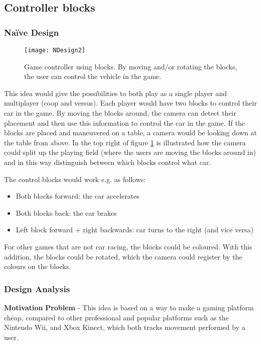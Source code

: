 \pagebreak

\subsection{Controller blocks} \label{nd2}
\subsubsection*{Naïve Design}

\begin{figure}[h]
\centering
\texttt{[image: NDesign2]}
\caption{Game controller using blocks. By moving and/or rotating the blocks, the user can control the vehicle in the game.}
\label{fig:ndesign2}
\end{figure}
This idea would give the possibilities to both play as a single player and multiplayer (coop and versus). Each player would have two blocks to control their car in the game. By moving the blocks around, the camera can detect their placement and then use this information to control the car in the game. If the blocks are placed and maneuvered on a table, a camera would be looking down at the table from above. In the top right of figure \ref{fig:ndesign2} is illustrated how the camera could split up the playing field (where the users are moving the blocks around in) and in this way distinguish between which blocks control what car.

The control blocks would work e.g. as follows:
\begin{itemize}
\item Both blocks forward: the car accelerates
\item Both blocks back: the car brakes
\item Left block forward + right backwards: car turns to the right (and vice versa)
\end{itemize}
For other games that are not car racing, the blocks could be coloured. With this addition, the blocks could be rotated, which the camera could register by the colours on the blocks.

\subsubsection*{Design Analysis}
\noindent\textbf{Motivation} \newline
\noindent\textbf{Problem} - This idea is based on a way to make a gaming platform cheap, compared to other professional and popular platforms such as the Nintendo Wii, and Xbox Kinect, which both tracks movement performed by a user.
\bigskip

